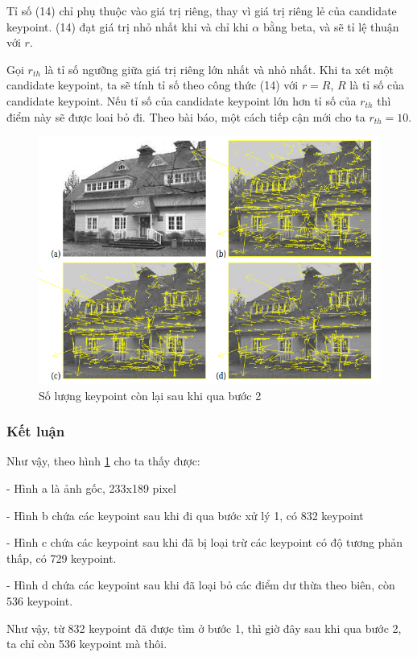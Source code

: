 \documentclass[conference]{IEEEtran}
\begin{document}
Tỉ số (14) chỉ phụ thuộc vào giá trị riêng, thay vì giá trị riêng lẻ của candidate keypoint. (14) đạt giá trị nhỏ nhất khi và chỉ khi $\alpha$ bằng beta, và sẽ tỉ lệ thuận với $r$.
 
Gọi $r_{th}$ là tỉ số ngưỡng giữa giá trị riêng lớn nhất và nhỏ nhất. Khi ta xét một candidate keypoint, ta sẽ tính tỉ số theo công thức (14) với $r = R$, $R$ là tỉ số của candidate keypoint. Nếu tỉ số của candidate keypoint lớn hơn tỉ số của $r_{th}$ thì điểm này sẽ được loai bỏ đi. Theo bài báo, một cách tiếp cận mới cho ta $r_{th} = 10$.
\begin{figure}
  \includegraphics[width=\linewidth]{danhgiakeypoint_quang}
  \caption{Số lượng keypoint còn lại sau khi qua bước 2}
  \label{fig:danhgiakeypoint_quang}
\end{figure}
\subsubsection{Kết luận}
Như vậy, theo hình \ref{fig:danhgiakeypoint_quang} cho ta thấy được: 

- Hình a là ảnh gốc, 233x189 pixel

- Hình b chứa các keypoint sau khi đi qua bước xử lý 1, có 832 keypoint

- Hình c chứa các keypoint sau khi đã bị loại trừ các keypoint có độ tương phản thấp, có 729 keypoint.

- Hình d chứa các keypoint sau khi đã loại bỏ các điểm dư thừa theo biên, còn 536 keypoint.

Như vậy, từ 832 keypoint đã được tìm ở bước 1, thì giờ đây sau khi qua bước 2, ta 
chỉ còn 536 keypoint mà thôi.
 
\end{document}
